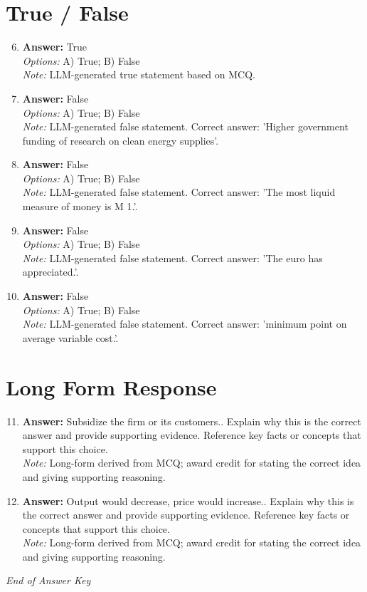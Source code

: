 \documentclass[12pt]{article}
\begin{document}
\section*{True / False}
\begin{enumerate}[label=\arabic*.]
\setcounter{enumi}{5}
\item \textbf{Answer:} True
\\ \textit{Options:} A) True; B) False
\\ \textit{Note:} LLM-generated true statement based on MCQ.
\item \textbf{Answer:} False
\\ \textit{Options:} A) True; B) False
\\ \textit{Note:} LLM-generated false statement. Correct answer: 'Higher government funding of research on clean energy supplies'.
\item \textbf{Answer:} False
\\ \textit{Options:} A) True; B) False
\\ \textit{Note:} LLM-generated false statement. Correct answer: 'The most liquid measure of money is M 1.'.
\item \textbf{Answer:} False
\\ \textit{Options:} A) True; B) False
\\ \textit{Note:} LLM-generated false statement. Correct answer: 'The euro has appreciated.'.
\item \textbf{Answer:} False
\\ \textit{Options:} A) True; B) False
\\ \textit{Note:} LLM-generated false statement. Correct answer: 'minimum point on average variable cost.'.
\end{enumerate}

\section*{Long Form Response}
\begin{enumerate}[label=\arabic*.]
\setcounter{enumi}{10}
\item \textbf{Answer:} Subsidize the firm or its customers.. Explain why this is the correct answer and provide supporting evidence. Reference key facts or concepts that support this choice.
\\ \textit{Note:} Long-form derived from MCQ; award credit for stating the correct idea and giving supporting reasoning.
\item \textbf{Answer:} Output would decrease, price would increase.. Explain why this is the correct answer and provide supporting evidence. Reference key facts or concepts that support this choice.
\\ \textit{Note:} Long-form derived from MCQ; award credit for stating the correct idea and giving supporting reasoning.
\end{enumerate}

\vfill
\noindent\textit{End of Answer Key}
\end{document}
